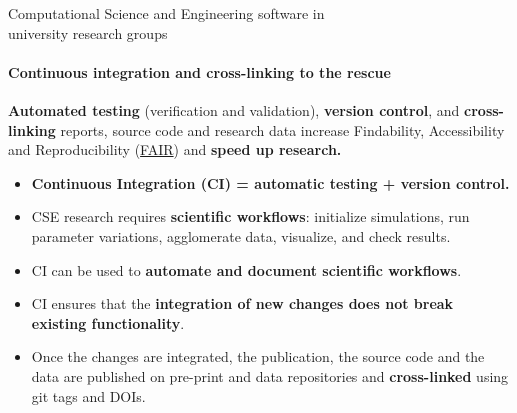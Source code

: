 \begin{frame}{Computational Science and Engineering software in\\university research groups}
    \framesubtitle{Continuous integration and cross-linking to the rescue}
    \vfill

    \textbf{Automated testing} (verification and validation), \textbf{version control}, and \textbf{cross-linking} reports, source code and research data increase Findability, Accessibility and Reproducibility (\href{ https://www.go-fair.org/fair-principles}{FAIR}) and \textbf{speed up research.} 

    \begin{itemize}

        \item \textbf{Continuous Integration (CI) = automatic testing + version control.}

        \item CSE research requires \textbf{scientific workflows}: initialize simulations, run parameter variations, agglomerate data, visualize, and check results.  
        \item CI can be used to \textbf{automate and document scientific workflows}. 
        \item CI ensures that the \textbf{integration of new changes does not break existing functionality}.
        \item Once the changes are integrated, the publication, the source code and the data are published on pre-print and data repositories and \textbf{cross-linked} using git tags and DOIs. 
    \end{itemize}

\end{frame}

